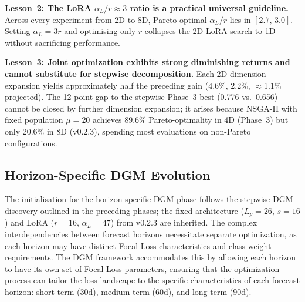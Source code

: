 ﻿\documentclass[twocolumn]{article}
\begin{document}
\textbf{Lesson~2: The LoRA $\alpha_L/r \approx 3$ ratio is a
practical universal guideline.}
Across every experiment from 2D to 8D, Pareto-optimal
$\alpha_L / r$ lies in $[2.7,\,3.0]$.
Setting $\alpha_L = 3r$ and optimising only $r$ collapses
the 2D LoRA search to 1D without sacrificing performance.

\textbf{Lesson~3: Joint optimization exhibits strong diminishing
returns and cannot substitute for stepwise decomposition.}
Each 2D dimension expansion yields approximately half the preceding
gain (4.6\%, 2.2\%, $\approx$1.1\% projected).
The 12-point gap to the stepwise Phase~3 best (0.776 vs.~0.656)
cannot be closed by further dimension expansion;
it arises because NSGA-II with fixed population $\mu{=}20$
achieves 89.6\% Pareto-optimality in 4D (Phase~3)
but only 20.6\% in 8D (v0.2.3),
spending most evaluations on non-Pareto configurations.

\subsection{Horizon-Specific DGM Evolution}
The initialisation for the horizon-specific DGM phase follows the stepwise DGM discovery
outlined in the preceding phases; the fixed architecture ($L_p{=}26$, $s{=}16$) and
LoRA ($r{=}16$, $\alpha_L{=}47$) from v0.2.3 are inherited.
The complex interdependencies between forecast horizons necessitate separate optimization,
as each horizon may have distinct Focal Loss characteristics and class weight requirements.
The DGM framework accommodates this by allowing each horizon to have its own set of Focal
Loss parameters, ensuring that the optimization process can tailor the loss landscape to
the specific characteristics of each forecast horizon: short-term (30d), medium-term (60d),
and long-term (90d).
\end{document}
